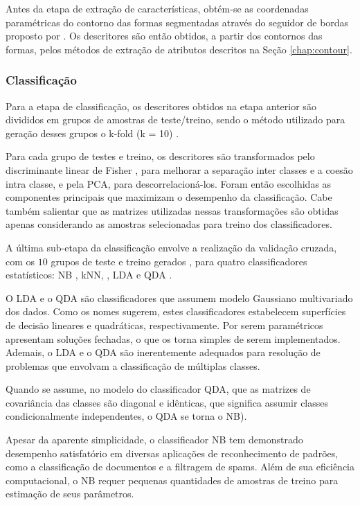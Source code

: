 Antes da etapa de extração de características, obtém-se as coordenadas paramétricas do contorno das formas segmentadas através do seguidor de bordas proposto por .
Os descritores são então obtidos, a partir dos contornos das formas, pelos métodos de extração de atributos descritos na Seção \ref{chap:contour}. 

\subsubsection*{Classificação}

Para a etapa de classificação, os descritores  obtidos na etapa anterior são divididos em grupos de amostras de teste/treino, sendo o método utilizado para geração desses grupos o k-fold (k = 10) \cite{Webb:2002}. 

Para cada grupo de testes e treino, os descritores são  transformados pelo discriminante linear de Fisher \cite{Webb:2002}, para melhorar a separação inter classes e a coesão intra classe, e pela \ac{PCA}, para  descorrelacioná-los. Foram então escolhidas as componentes principais que maximizam o desempenho da classificação.  Cabe também salientar que as matrizes utilizadas nessas transformações são obtidas apenas considerando as amostras selecionadas para treino dos classificadores.

A última sub-etapa da classificação envolve a realização da validação cruzada, com os $10$ grupos de teste e treino gerados \cite{Webb:2002}, para quatro classificadores estatísticos: \ac{NB} \cite{Fukunaga:1990}, \ac{kNN}, \cite{Fukunaga:1990,Webb:2002}, \ac{LDA} \cite{Webb:2002} e \ac{QDA} \cite{Fukunaga:1990}. 

O \ac{LDA} e o \ac{QDA} são classificadores que assumem modelo Gaussiano multivariado dos dados. Como os nomes sugerem,  estes classificadores estabelecem superfícies de decisão lineares e quadráticas, respectivamente. Por serem paramétricos apresentam soluções fechadas, o que os torna simples de serem implementados. Ademais, o \ac{LDA} e o \ac{QDA} são inerentemente adequados para resolução de problemas que envolvam a classificação de múltiplas classes.

Quando se assume, no modelo do classificador \ac{QDA}, que as matrizes de covariância das classes são diagonal e idênticas, que significa assumir classes condicionalmente independentes, o \ac{QDA} se torna o \ac{NB}). 

Apesar da aparente simplicidade, o classificador \ac{NB} tem demonstrado desempenho satisfatório em diversas aplicações de reconhecimento de padrões, como a classificação de documentos e a filtragem de spams. Além de sua eficiência computacional, o \ac{NB} requer pequenas quantidades de amostras de treino para estimação de seus parâmetros.

